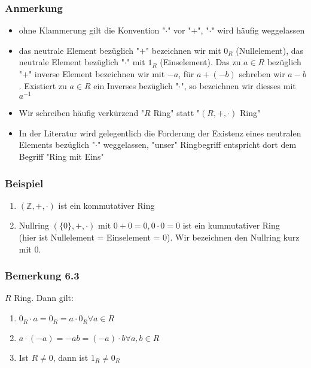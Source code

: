 \documentclass[a4paper]{scrartcl}
\DeclareMathOperator{\Forall}{\forall}
\theoremstyle{definition}
\theoremstyle{plain}
\theoremstyle{plain}
\theoremstyle{remark}
\theoremstyle{remark}
\theoremstyle{remark}
\theoremstyle{remark}
\theoremstyle{remark}
\begin{document}
\subsubsection{Anmerkung}
\label{sec-3-2-1}
\begin{itemize}
\item ohne Klammerung gilt die Konvention "$\cdot$" vor "$+$", "$\cdot$" wird häufig weggelassen
\item das neutrale Element bezüglich "$+$" bezeichnen wir mit $0_R$ (Nullelement), das neutrale Element bezüglich "$\cdot$" mit $1_R$ (Einselement).
Das zu $a\in R$ bezüglich "$+$" inverse Element bezeichnen wir mit $-a$,
für $a + (-b)$ schreben wir $a - b$. Existiert zu $a\in R$ ein Inverses bezüglich "$\cdot$", so bezeichnen wir diesses mit $a^{-1}$
\item Wir schreiben häufig verkürzend "$R$ Ring" statt "$(R,+,\cdot)$ Ring"
\item In der Literatur wird gelegentlich die Forderung der Existenz eines neutralen Elements bezüglich "$\cdot$" weggelassen, "unser" Ringbegriff
entspricht dort dem Begriff "Ring mit Eins"
\end{itemize}
\subsubsection{Beispiel}
\label{sec-3-2-2}
\begin{enumerate}
\item $(\mathbb{Z},+,\cdot)$ ist ein kommutativer Ring
\item Nullring $(\{0\},+,\cdot)$ mit $0 + 0 = 0, 0\cdot 0 = 0$ ist ein kummutativer Ring \\
       (hier ist Nullelement = Einselement = 0). Wir bezeichnen den Nullring kurz mit $0$.
\end{enumerate}
\subsubsection{Bemerkung 6.3}
\label{sec-3-2-3}
$R$ Ring. Dann gilt:
\begin{enumerate}
\item $0_R\cdot a = 0_R = a\cdot 0_R\Forall a\in R$
\item $a\cdot (-a) = - a b = (-a) \cdot b \Forall a,b\in R$
\item Ist $R\neq 0$, dann ist $1_R\neq 0_R$
\end{enumerate}
\end{document}
